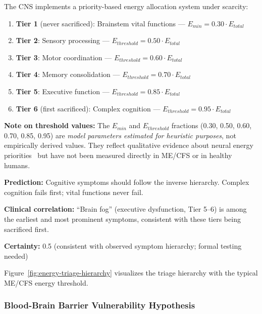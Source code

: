 \begin{hypothesis}
\label{hyp:energy-triage}
The CNS implements a priority-based energy allocation system under scarcity:
\begin{enumerate}
    \item \textbf{Tier 1} (never sacrificed): Brainstem vital functions --- $E_{min} = 0.30 \cdot E_{total}$
    \item \textbf{Tier 2}: Sensory processing --- $E_{threshold} = 0.50 \cdot E_{total}$
    \item \textbf{Tier 3}: Motor coordination --- $E_{threshold} = 0.60 \cdot E_{total}$
    \item \textbf{Tier 4}: Memory consolidation --- $E_{threshold} = 0.70 \cdot E_{total}$
    \item \textbf{Tier 5}: Executive function --- $E_{threshold} = 0.85 \cdot E_{total}$
    \item \textbf{Tier 6} (first sacrificed): Complex cognition --- $E_{threshold} = 0.95 \cdot E_{total}$
\end{enumerate}

\textbf{Note on threshold values:} The $E_{min}$ and $E_{threshold}$ fractions (0.30, 0.50, 0.60, 0.70, 0.85, 0.95) are \emph{model parameters estimated for heuristic purposes}, not empirically derived values. They reflect qualitative evidence about neural energy priorities~\cite{Magistretti2018} but have not been measured directly in ME/CFS or in healthy humans.

\textbf{Prediction:} Cognitive symptoms should follow the inverse hierarchy. Complex cognition fails first; vital functions never fail.

\textbf{Clinical correlation:} ``Brain fog'' (executive dysfunction, Tier 5--6) is among the earliest and most prominent symptoms, consistent with these tiers being sacrificed first.

\textbf{Certainty:} 0.5 (consistent with observed symptom hierarchy; formal testing needed)
\end{hypothesis}

Figure~\ref{fig:energy-triage-hierarchy} visualizes the triage hierarchy with the typical ME/CFS energy threshold.




\subsubsection{Blood-Brain Barrier Vulnerability Hypothesis}

